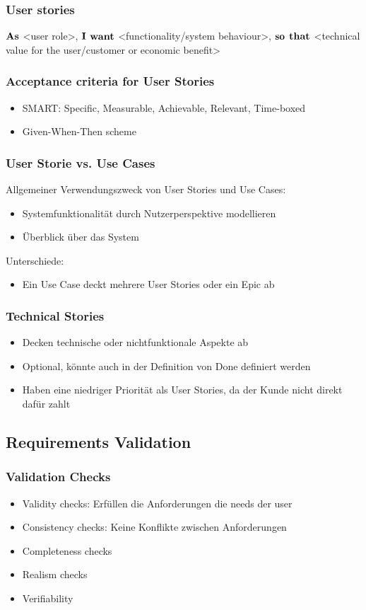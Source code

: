 \subsubsection{User stories}
$\bold{As}$ <user role>, $\bold{I}$ $\bold{want}$ <functionality/system behaviour>, $\bold{so}$ $\bold{that}$ <technical value for the user/customer or economic benefit>
\subsubsection{Acceptance criteria for User Stories}
\begin{itemize}
	\item SMART: Specific, Measurable, Achievable, Relevant, Time-boxed
	\item Given-When-Then scheme
\end{itemize}
\subsubsection{User Storie vs. Use Cases}
Allgemeiner Verwendungszweck von User Stories und Use Cases:
\begin{itemize}
	\item Systemfunktionalität durch Nutzerperspektive modellieren
	\item Überblick über das System
\end{itemize}
Unterschiede:
\begin{itemize}
	\item Ein Use Case deckt mehrere User Stories oder ein Epic ab
\end{itemize}
\subsubsection{Technical Stories}
\begin{itemize}
	\item Decken technische oder nichtfunktionale Aspekte ab
	\item Optional, könnte auch in der Definition von Done definiert werden
	\item Haben eine niedriger Priorität als User Stories, da der Kunde nicht direkt dafür zahlt
\end{itemize}
\subsection{Requirements Validation}
\subsubsection{Validation Checks}
\begin{itemize}
	\item Validity checks: Erfüllen die Anforderungen die needs der user
	\item Consistency checks: Keine Konflikte zwischen Anforderungen
	\item Completeness checks
	\item Realism checks
	\item Verifiability
\end{itemize}
